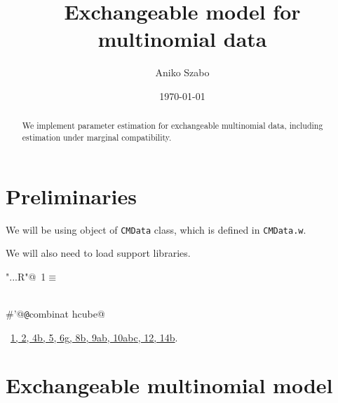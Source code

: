 \documentclass[reqno]{amsart}
\title{Exchangeable model for multinomial data}
\author{Aniko Szabo}
\date{\today}
\renewcommand{\NWtarget}[2]{\hypertarget{#1}{#2}}
\renewcommand{\NWlink}[2]{\hyperlink{#1}{#2}}
\begin{document}
\maketitle


\begin{abstract}
We implement parameter estimation for exchangeable multinomial data, including estimation under marginal compatibility. 
\end{abstract}

\section{Preliminaries}

We will be using object of \texttt{CMData} class, which is defined in \texttt{CMData.w}.

We will also need to load support libraries.

\begin{flushleft} \small
\begin{minipage}{\linewidth}\label{scrap1}\raggedright\small
\NWtarget{nuweb1}{} \verb@"..\R\ExchMultinomial.R"@\nobreak\ {\footnotesize {1}}$\equiv$
\vspace{-1ex}
\begin{list}{}{} \item
\mbox{}\verb@@\\
\mbox{}\verb@#'@{\tt @}\verb@importFrom combinat hcube@\\
\mbox{}\verb@@{\NWsep}
\end{list}
\vspace{-1.5ex}
\footnotesize
\begin{list}{}{\setlength{\itemsep}{-\parsep}\setlength{\itemindent}{-\leftmargin}}
\item \NWtxtFileDefBy\ \NWlink{nuweb1}{1}\NWlink{nuweb2}{, 2}\NWlink{nuweb4b}{, 4b}\NWlink{nuweb5}{, 5}\NWlink{nuweb6g}{, 6g}\NWlink{nuweb8b}{, 8b}\NWlink{nuweb9a}{, 9a}\NWlink{nuweb9b}{b}\NWlink{nuweb10a}{, 10a}\NWlink{nuweb10b}{b}\NWlink{nuweb10c}{c}\NWlink{nuweb12}{, 12}\NWlink{nuweb14b}{, 14b}.

\item{}
\end{list}
\end{minipage}\vspace{4ex}
\end{flushleft}
\section{Exchangeable multinomial model}\label{S:MLE} 
\end{document}
